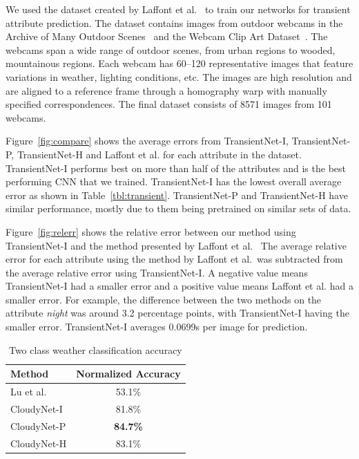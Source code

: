 \documentclass{article}
\newcommand{\figref}[1]{Figure~\ref{fig:#1}}
\newcommand{\tblref}[1]{Table~\ref{tbl:#1}}
\begin{document}
We used the dataset created by Laffont et al.~\cite{Laffont14} to
train our networks for transient attribute prediction. The dataset
contains images from outdoor webcams in the Archive of Many Outdoor
Scenes~\cite{jacobs07amos} and the Webcam Clip Art
Dataset~\cite{lalondesig09}.  The webcams span a wide range of outdoor
scenes, from urban regions to wooded, mountainous regions. Each webcam
has 60--120 representative images that feature variations in weather,
lighting conditions, etc.  The images are high resolution and are
aligned to a reference frame through a homography warp with manually
specified correspondences.  The final dataset consists of 8571 images
from 101 webcams.

\figref{compare} shows the average errors from TransientNet-I, TransientNet-P, 
TransientNet-H and Laffont et al. for each attribute in the dataset.  TransientNet-I 
performs best on more than half of the attributes and is the best performing CNN that we trained.  
TransientNet-I has the lowest overall average error as shown in \tblref{transient}.  TransientNet-P
and TransientNet-H have similar performance, mostly due to them being pretrained on similar 
sets of data.

\figref{relerr} shows the relative error between our method using TransientNet-I
and the method presented by Laffont et al.~\cite{Laffont14}  The average relative error 
for each attribute using the method by Laffont et al.\ was subtracted from
the average relative error using TransientNet-I.  A negative value means TransientNet-I
had a smaller error and a positive value means Laffont et al. had a smaller
error.  For example, the difference between the two methods on the attribute
\emph{night} was around 3.2 percentage points, with TransientNet-I having the smaller 
error.  TransientNet-I averages 0.0699s per image for prediction. 

\begin{table}[t]
	\centering
	\begin{tabular}{ | l | c | }
		\hline
			Method & Normalized Accuracy \\ \hline \hline
			Lu et al.~\cite{lutwoclass}& 53.1\% \\ \hline
			CloudyNet-I & 81.8\% \\ \hline
			CloudyNet-P & \textbf{84.7\%} \\ \hline
			CloudyNet-H & 83.1\% \\ 
		\hline
	\end{tabular}
	\caption{Two class weather classification accuracy}
	\label{tbl:twoclass}
\end{table}
\end{document}
